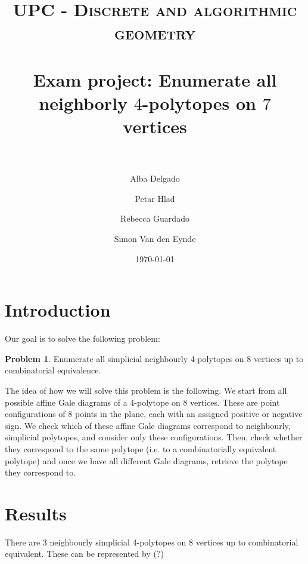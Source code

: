 \documentclass[paper=a4, fontsize=11pt]{scrartcl} %
\title{
\normalfont \normalsize
\textsc{UPC - Discrete and algorithmic geometry} \\ [25pt] %
\horrule{0.5pt} \\[0.4cm] %
\huge Exam project: Enumerate all neighborly $4$-polytopes on $7$ vertices \\ %
\horrule{2pt} \\[0.5cm] %
}
\author{Alba Delgado \and Petar Hlad \and Rebecca Guardado \and Simon Van den Eynde} %
\date{\normalsize\today} %
\theoremstyle{definition}
\newtheorem{prob}{Problem}
\begin{document}
\maketitle %



\section{Introduction}
Our goal is to solve the following problem:
\begin{prob}
Enumerate all simplicial neighbourly 4-polytopes on 8 vertices up to combinatorial equivalence.
\end{prob}
The idea of how we will solve this problem is the following. We start from all possible affine Gale diagrams of a 4-polytope on 8 vertices. These are point configurations of 8 points in the plane, each with an assigned positive or negative sign. We check which of these affine Gale diagrams correspond to neighbourly, simplicial polytopes, and consider only these configurations. Then, check whether they correspond to the same polytope (i.e. to a combinatorially equivalent polytope) and once we have all different Gale diagrams, retrieve the polytope they correspond to.


\section{Results}
There are 3 neighbourly simplicial 4-polytopes on 8 vertices up to combinatorial equivalent. These can be represented by (?)


\end{document}
